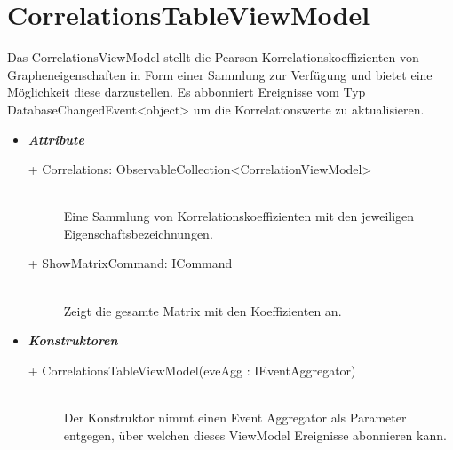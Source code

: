\documentclass[13pt]{scrreprt}
\begin{document}
	\section{CorrelationsTableViewModel}
	Das CorrelationsViewModel stellt die Pearson-Korrelationskoeffizienten von Grapheneigenschaften in Form einer Sammlung zur Verf\"ugung und bietet eine M\"oglichkeit diese darzustellen. Es abbonniert Ereignisse vom Typ DatabaseChangedEvent<object> um die Korrelationswerte zu aktualisieren.
	\begin{itemize}[label = {$\circ$}]
		\item {\large \textbf{\textit{Attribute}}\par}
		\begin{description}
			\item [+ Correlations: ObservableCollection<CorrelationViewModel>] \hfill \\ Eine Sammlung von Korrelationskoeffizienten mit den jeweiligen Eigenschaftsbezeichnungen.
			\item [+ ShowMatrixCommand: ICommand] \hfill \\ Zeigt die gesamte Matrix mit den Koeffizienten an.
		\end{description}
		\item {\large \textbf{\textit{Konstruktoren}}\par}
		\begin{description}
			\item [+ CorrelationsTableViewModel(eveAgg : IEventAggregator)] \hfill \\ Der Konstruktor nimmt einen Event Aggregator als Parameter entgegen, über welchen dieses ViewModel Ereignisse abonnieren kann.
		\end{description}
	\end{itemize}
	
\end{document}
